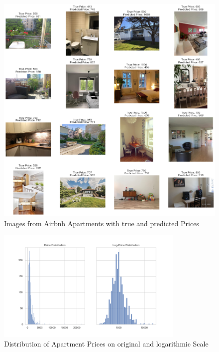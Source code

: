 \documentclass[12pt, letterpaper]{article}
\begin{document}
\newpage




\appendix

\begin{figure}[t]
    \centering
    \includegraphics[width=\textwidth]{cnn_examples.png}
    \caption{Images from Airbnb Apartments with true and predicted Prices}
    \label{fig:cnn-examples}
\end{figure}

\begin{figure}[t]
    \centering
    \includegraphics[width=0.8\textwidth]{price_distribution.png}
    \caption{Distribution of Apartment Prices on original and logarithmic Scale}
    \label{fig:price-distribution}
\end{figure}
\end{document}
